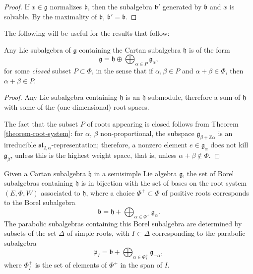 \begin{proof}
 If $x\in \mathfrak g$ normalizes $\mathfrak b$, then the subalgebra $\mathfrak b'$ generated by $\mathfrak b$ and $x$ is solvable. By the maximality of $\mathfrak b$, $\mathfrak b' = \mathfrak b$.
\end{proof}




The following will be useful for the results that follow:

\begin{lemma}
\label{lemma-closed-subset}
Any Lie subalgebra of $\mathfrak g$ containing the Cartan subalgebra $\mathfrak h$ is of the form  
$$ \mathfrak g = \mathfrak h \oplus \bigoplus_{\alpha\in P} \mathfrak g_\alpha,$$
for some \emph{closed} subset $P\subset \Phi$, in the sense that if $\alpha,\beta\in P$ and $\alpha+\beta\in \Phi$, then $\alpha+\beta\in P$.
\end{lemma}

\begin{proof}
Any Lie subalgebra containing $\mathfrak h$ is an $\mathfrak h$-submodule, therefore a sum of $\mathfrak h$ with some of the (one-dimensional) root spaces.

The fact that the subset $P$ of roots appearing is closed follows from Theorem \ref{theorem-root-system}: for $\alpha$, $\beta$ non-proportional, the subspace $\mathfrak g_{\beta+\mathbb Z\alpha}$ is an irreducible $\mathfrak{sl}_{2,\alpha}$-representation; therefore, a nonzero element $e\in \mathfrak g_\alpha$ does not kill $\mathfrak g_\beta$, unless this is the highest weight space, that is, unless $\alpha+\beta\notin \Phi$. 
\end{proof}


\begin{proposition}
\label{proposition-roots-parabolics}
 Given a Cartan subalgebra $\mathfrak h$ in a semisimple Lie algebra $\mathfrak g$, the set of Borel subalgebras containing $\mathfrak h$ is in bijection with the set of bases on the root system $(E, \Phi,W)$ associated to $\mathfrak h$, where a choice $\Phi^+\subset \Phi$ of positive roots corresponds to the Borel subalgebra
 $$ \mathfrak b = \mathfrak h + \bigoplus_{\alpha\in\Phi^+} \mathfrak g_\alpha.$$
 The parabolic subalgebras containing this Borel subalgebra are determined by subsets of the set $\Delta$ of simple roots, with $I\subset\Delta$ corresponding to the parabolic subalgebra
 $$ \mathfrak p_I = \mathfrak b + \bigoplus_{\alpha\in \Phi_I^+} \mathfrak g_{-\alpha},$$
 where $\Phi_I^+$ is the set of elements of $\Phi^+$ in the span of $I$.
\end{proposition}

